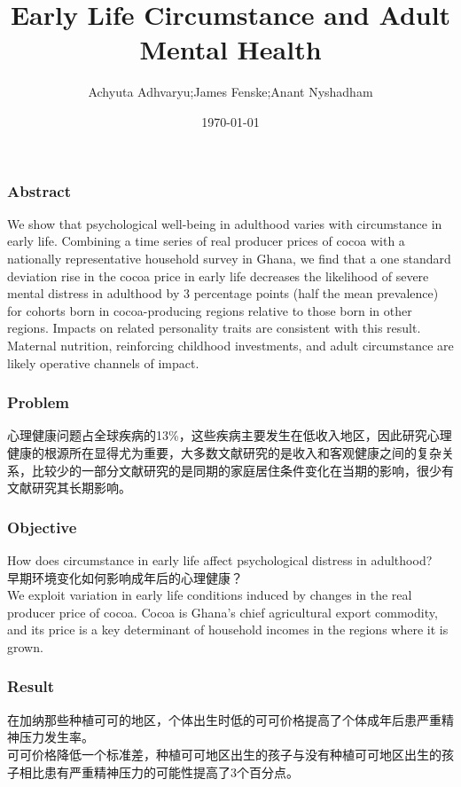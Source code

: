 \documentclass{beamer}
\title[文献分享:ZY]{Early Life Circumstance and Adult Mental Health}
\author[Achyuta et al.]{Achyuta Adhvaryu;James Fenske;Anant Nyshadham}
\date{\today}
\begin{document}
\frame{\titlepage}



\begin{frame}
\frametitle{Abstract}
We show that psychological well-being in adulthood varies with circumstance in early life. Combining a time series of real producer prices of cocoa with a nationally representative household survey in Ghana, we ﬁnd that a one standard deviation rise in the cocoa price in early life decreases the likelihood of severe mental distress in adulthood by 3 percentage points (half the mean prevalence) for cohorts born in cocoa-producing regions relative to those born in other regions. Impacts on related personality traits are consistent with this result. Maternal nutrition, reinforcing childhood investments, and adult circumstance are likely operative channels of impact.
\citep{Almond2019}\citet{Adhvaryu2019}
\end{frame}



\begin{frame}
    \frametitle{Problem}
心理健康问题占全球疾病的13\%，这些疾病主要发生在低收入地区，因此研究心理健康的根源所在显得尤为重要，大多数文献研究的是收入和客观健康之间的复杂关系，比较少的一部分文献研究的是同期的家庭居住条件变化在当期的影响，很少有文献研究其长期影响。
\end{frame}

\begin{frame}
    \frametitle{Objective}
How does circumstance in early life aﬀect psychological distress in adulthood?
\\ 早期环境变化如何影响成年后的心理健康？
\\ We exploit variation in early life conditions induced by changes in the real producer price of cocoa. Cocoa is Ghana’s chief agricultural export commodity, and its price is a key determinant of household incomes in the regions where it is grown.
\end{frame}



\begin{frame}
    \frametitle{Result}
    在加纳那些种植可可的地区，个体出生时低的可可价格提高了个体成年后患严重精神压力发生率。
    \\ 可可价格降低一个标准差，种植可可地区出生的孩子与没有种植可可地区出生的孩子相比患有严重精神压力的可能性提高了3个百分点。
\end{frame}
\end{document}
